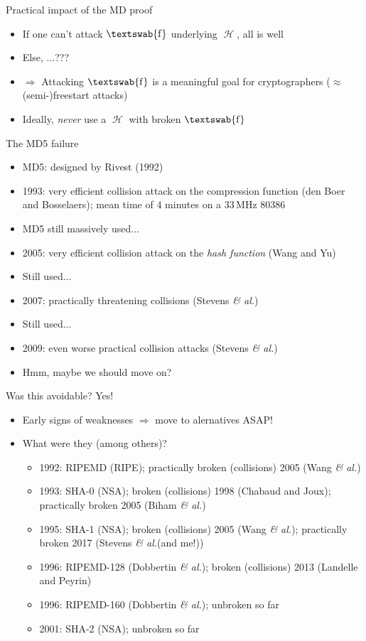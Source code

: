 \documentclass[xcolor=table,usenames,dvipsnames,compress]{beamer}
\newcommand\etal{\emph{\& al.}\xspace}
\DeclareMathOperator\hash{\mathcal{H}}
\DeclareMathOperator\cf{\textswab{f}}
\begin{document}
\begin{frame}{Practical impact of the MD proof}

\begin{itemize}
\item If one can't attack $\cf$ underlying $\hash$, all is well
\item Else, ...???
\item $\Rightarrow$ Attacking $\cf$ is a meaningful goal for cryptographers ($\approx$ (semi-)freestart attacks)
\item Ideally, \emph{never} use a $\hash$ with broken $\cf$
\end{itemize}

\end{frame}

\begin{frame}{The MD5 failure}
\vspace{-6mm}
\begin{itemize}
\item MD5: designed by Rivest (1992)
\item 1993: very efficient collision attack on the compression function (den Boer and Bosselaers); mean time of 4 minutes on a 33\,MHz 80386
\item MD5 still massively used...
\item 2005: very efficient collision attack on the \emph{hash function} (Wang and Yu)
\item Still used...
\item 2007: practically threatening collisions (Stevens \etal)
\item Still used...
\item 2009: even worse practical collision attacks (Stevens \etal)
\item Hmm, maybe we should move on?
\end{itemize}
\end{frame}

\begin{frame}{Was this avoidable?}
Yes!
\begin{itemize}
\item Early signs of weaknesses $\Rightarrow$ move to alernatives ASAP!
\item What were they (among others)?
\begin{itemize}
\item 1992: {\color{Red}RIPEMD} (RIPE); practically broken (collisions) 2005 (Wang \etal)
\item 1993: {\color{Red}SHA-0} (NSA); broken (collisions) 1998 (Chabaud and Joux); practically broken 2005 (Biham \etal)
\item 1995: {\color{RedOrange}SHA-1} (NSA); broken (collisions) 2005 (Wang \etal); practically broken 2017 (Stevens \etal (and me!))
\item 1996: {\color{RedOrange}RIPEMD-128} (Dobbertin \etal); broken (collisions) 2013 (Landelle and Peyrin)
\item 1996: {\color{Green}RIPEMD-160} (Dobbertin \etal); unbroken so far
\item 2001: {\color{Green}SHA-2} (NSA); unbroken so far
\end{itemize}
\end{itemize}
\end{frame}
\end{document}
